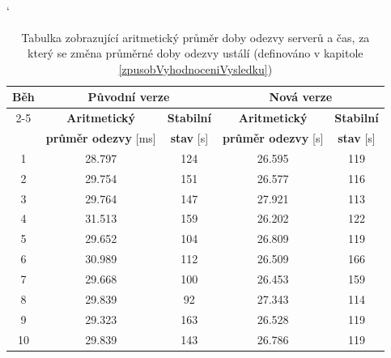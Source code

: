             \begin{table}[ht]
             \catcode`
             \begin{adjustwidth}{-0.5cm}{}
             \begin{center}
              \begin{tabular}{| c || c | c || c | c |} \hline
                \multirow{4}{*}{Běh}  &   \multicolumn{2}{c||}{\textbf{Původní verze}}  &  \multicolumn{2}{c|}{\textbf{Nová verze}}\\ \cline{2-5}
                 & \textbf{Aritmetický} &  \textbf{Stabilní} &  \textbf{Aritmetický}  &  \textbf{Stabilní}\\  
                 & \textbf{průměr odezvy} [ms]  &   \textbf{stav} [s]  &  \textbf{průměr odezvy} [s] &  \textbf{stav} [s]\\\hline
                1 & 28.797 & 124 &  26.595 & 119\\\hline
                2  & 29.754 & 151 & 26.577 & 116\\\hline
                3 & 29.764 & 147 & 27.921 & 113\\\hline
                4 & 31.513  & 159 & 26.202 & 122\\\hline
                5 & 29.652 & 104 & 26.809 & 119\\\hline\hline
                6 & 30.989 & 112 & 26.509 & 166\\\hline
                7 & 29.668 & 100 & 26.453 & 159\\\hline
                8 & 29.839 & 92 & 27.343 & 114\\\hline
                9 & 29.323 & 163 & 26.528 & 119\\\hline
                10 & 29.839 & 143 & 26.786 & 119\\\hline
              \end{tabular}
              \caption{Tabulka zobrazující aritmetický průměr doby odezvy serverů a čas, za který se změna průměrné doby odezvy ustálí 
                (definováno v kapitole \ref{zpusobVyhodnoceniVysledku}) }
              \label{tabMainPageMain}
             \end{center}
            \end{adjustwidth}
            \end{table}


